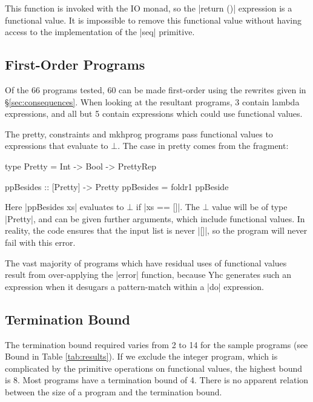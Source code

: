 \documentclass{sigplanconf}
\begin{document}
This function is invoked with the IO monad, so the |return ()| expression is a functional value. It is impossible to remove this functional value without having access to the implementation of the |seq| primitive.

\subsection{First-Order Programs}

Of the 66 programs tested, 60 can be made first-order using the rewrites given in \S\ref{sec:consequences}. When looking at the resultant programs, 3 contain lambda expressions, and all but 5 contain expressions which could use functional values.

The pretty, constraints and mkhprog programs pass functional values to expressions that evaluate to $\bot$. The case in pretty comes from the fragment:

\begin{comment}
\begin{code}
data PrettyRep = PrettyRep
ppBeside :: Pretty -> Pretty -> Pretty
\end{code}
\end{comment}
\begin{code}
type Pretty = Int -> Bool -> PrettyRep

ppBesides :: [Pretty] -> Pretty
ppBesides = foldr1 ppBeside
\end{code}

Here |ppBesides xs| evaluates to $\bot$ if |xs == []|. The $\bot$ value will be of type |Pretty|, and can be given further arguments, which include functional values. In reality, the code ensures that the input list is never |[]|, so the program will never fail with this error.

The vast majority of programs which have residual uses of functional values result from over-applying the |error| function, because Yhc generates such an expression when it desugars a pattern-match within a |do| expression.

\subsection{Termination Bound}

The termination bound required varies from 2 to 14 for the sample programs (see Bound in Table \ref{tab:results}). If we exclude the integer program, which is complicated by the primitive operations on functional values, the highest bound is 8. Most programs have a termination bound of 4. There is no apparent relation between the size of a program and the termination bound.
\end{document}
